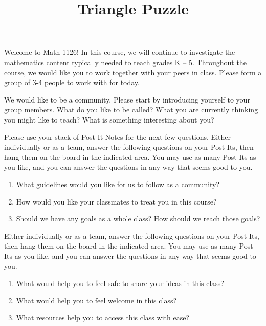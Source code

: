 \documentclass {ximera}
\title{Triangle Puzzle}
\begin{document}
\begin{abstract} 
\end{abstract}
\maketitle

Welcome to Math 1126! In this course, we will continue to investigate the mathematics content typically needed to teach grades K -- 5. Throughout the course, we would like you to work together with your peers in class. Please form a group of 3-4 people to work with for today.

\begin{question}
We would like to be a community. Please start by introducing yourself to your group members. What do you like to be called? What you are currently thinking you might like to teach? What is something interesting about you?
\end{question}


\begin{question}
Please use your stack of Post-It Notes for the next few questions. Either individually or as a team, answer the following questions on your Post-Its, then hang them on the board in the indicated area. You may use as many Post-Its as you like, and you can answer the questions in any way that seems good to you.
\begin{enumerate}
	\item What guidelines would you like for us to follow as a community?
	\item How would you like your classmates to treat you in this course?
	\item Should we have any goals as a whole class? How should we reach those goals?
\end{enumerate}
\end{question}

\begin{question}
Either individually or as a team, answer the following questions on your Post-Its, then hang them on the board in the indicated area. You may use as many Post-Its as you like, and you can answer the questions in any way that seems good to you.
\begin{enumerate}
	\item What would help you to feel safe to share your ideas in this class?
	\item What would help you to feel welcome in this class?
	\item What resources help you to access this class with ease?
\end{enumerate}

\end{question}
\end{document}
